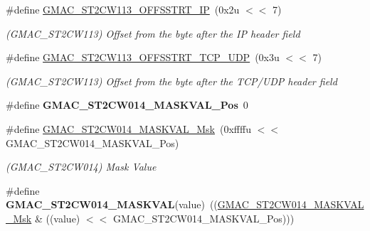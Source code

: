\begin{DoxyCompactItemize}
\mbox{\label{group__SAMV71__GMAC_ga0451725a2fe3ff07f65bd20053a1766c}} 
\#define \mbox{\hyperlink{group__SAMV71__GMAC_ga0451725a2fe3ff07f65bd20053a1766c}{G\+M\+A\+C\+\_\+\+S\+T2\+C\+W113\+\_\+\+O\+F\+F\+S\+S\+T\+R\+T\+\_\+\+IP}}~(0x2u $<$$<$ 7)
\begin{DoxyCompactList}\small\item\em (G\+M\+A\+C\+\_\+\+S\+T2\+C\+W113) Offset from the byte after the IP header field \end{DoxyCompactList}\item 
\mbox{\label{group__SAMV71__GMAC_ga105d0358e0c92f99e92590f9b77de2d8}} 
\#define \mbox{\hyperlink{group__SAMV71__GMAC_ga105d0358e0c92f99e92590f9b77de2d8}{G\+M\+A\+C\+\_\+\+S\+T2\+C\+W113\+\_\+\+O\+F\+F\+S\+S\+T\+R\+T\+\_\+\+T\+C\+P\+\_\+\+U\+DP}}~(0x3u $<$$<$ 7)
\begin{DoxyCompactList}\small\item\em (G\+M\+A\+C\+\_\+\+S\+T2\+C\+W113) Offset from the byte after the T\+C\+P/\+U\+DP header field \end{DoxyCompactList}\item 
\mbox{\label{group__SAMV71__GMAC_ga657749dca5b00645074d25c44f56f651}} 
\#define {\bfseries G\+M\+A\+C\+\_\+\+S\+T2\+C\+W014\+\_\+\+M\+A\+S\+K\+V\+A\+L\+\_\+\+Pos}~0
\item 
\mbox{\label{group__SAMV71__GMAC_ga1c6899b604dac9156840df20fea497a7}} 
\#define \mbox{\hyperlink{group__SAMV71__GMAC_ga1c6899b604dac9156840df20fea497a7}{G\+M\+A\+C\+\_\+\+S\+T2\+C\+W014\+\_\+\+M\+A\+S\+K\+V\+A\+L\+\_\+\+Msk}}~(0xffffu $<$$<$ G\+M\+A\+C\+\_\+\+S\+T2\+C\+W014\+\_\+\+M\+A\+S\+K\+V\+A\+L\+\_\+\+Pos)
\begin{DoxyCompactList}\small\item\em (G\+M\+A\+C\+\_\+\+S\+T2\+C\+W014) Mask Value \end{DoxyCompactList}\item 
\mbox{\label{group__SAMV71__GMAC_ga4fa1c66a919b85c93d2811136f0c4474}} 
\#define {\bfseries G\+M\+A\+C\+\_\+\+S\+T2\+C\+W014\+\_\+\+M\+A\+S\+K\+V\+AL}(value)~((\mbox{\hyperlink{group__SAMV71__GMAC_ga1c6899b604dac9156840df20fea497a7}{G\+M\+A\+C\+\_\+\+S\+T2\+C\+W014\+\_\+\+M\+A\+S\+K\+V\+A\+L\+\_\+\+Msk}} \& ((value) $<$$<$ G\+M\+A\+C\+\_\+\+S\+T2\+C\+W014\+\_\+\+M\+A\+S\+K\+V\+A\+L\+\_\+\+Pos)))

\end{DoxyCompactItemize}
